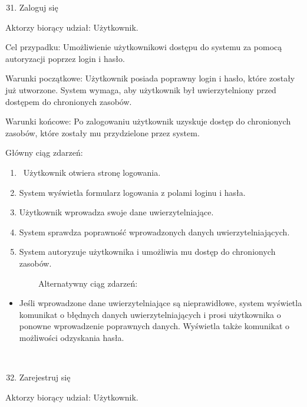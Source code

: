 \documentclass[
]{article}
\providecommand{\tightlist}{%
  \setlength{\itemsep}{0pt}\setlength{\parskip}{0pt}}
\begin{document}
\begin{enumerate}
\setcounter{enumi}{30}
\tightlist
\item
  {Zaloguj się}
\end{enumerate}

{Aktorzy biorący udział: Użytkownik.}

{Cel przypadku: Umożliwienie użytkownikowi dostępu do systemu za pomocą
autoryzacji poprzez login i hasło.}

{Warunki początkowe: Użytkownik posiada poprawny login i hasło, które
zostały już utworzone. System wymaga, aby użytkownik był uwierzytelniony
przed dostępem do chronionych zasobów.}

{Warunki końcowe: Po zalogowaniu użytkownik uzyskuje dostęp do
chronionych zasobów, które zostały mu przydzielone przez system.}

{Główny ciąg zdarzeń:}

\begin{enumerate}
\tightlist
\item
  {~Użytkownik otwiera stronę logowania.}
\item
  {System wyświetla formularz logowania z polami loginu i hasła.}
\item
  {Użytkownik wprowadza swoje dane uwierzytelniające.}
\item
  {System sprawdza poprawność wprowadzonych danych uwierzytelniających.}
\item
  {System autoryzuje użytkownika i umożliwia mu dostęp do chronionych
  zasobów.}
\end{enumerate}

{~~~~~~~~Alternatywny ciąg zdarzeń:}

\begin{itemize}
\tightlist
\item
  {Jeśli wprowadzone dane uwierzytelniające są nieprawidłowe, system
  wyświetla komunikat o błędnych danych uwierzytelniających i prosi
  użytkownika o ponowne wprowadzenie poprawnych danych. Wyświetla także
  komunikat o możliwości odzyskania hasła.\\
  \strut \\
  }
\end{itemize}

\begin{enumerate}
\setcounter{enumi}{31}
\tightlist
\item
  {Zarejestruj się}
\end{enumerate}

{Aktorzy biorący udział: Użytkownik.}
\end{document}
